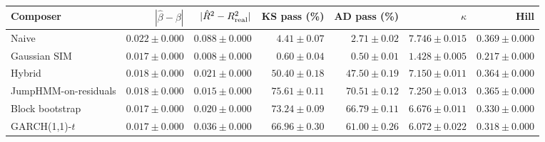 \begin{tabular}{lrrrrrr}
\toprule
Composer & $|\hat\beta-\beta|$ & $|\hat R^2 - R^2_{\mathrm{real}}|$ & KS pass (\%) & AD pass (\%) & $\kappa$ & Hill \\
\midrule
Naive & $0.022 \pm 0.000$ & $0.088 \pm 0.000$ & $4.41 \pm 0.07$ & $2.71 \pm 0.02$ & $7.746 \pm 0.015$ & $0.369 \pm 0.000$ \\
Gaussian SIM & $0.017 \pm 0.000$ & $0.008 \pm 0.000$ & $0.60 \pm 0.04$ & $0.50 \pm 0.01$ & $1.428 \pm 0.005$ & $0.217 \pm 0.000$ \\
Hybrid & $0.018 \pm 0.000$ & $0.021 \pm 0.000$ & $50.40 \pm 0.18$ & $47.50 \pm 0.19$ & $7.150 \pm 0.011$ & $0.364 \pm 0.000$ \\
JumpHMM-on-residuals & $0.018 \pm 0.000$ & $0.015 \pm 0.000$ & $75.61 \pm 0.11$ & $70.51 \pm 0.12$ & $7.250 \pm 0.013$ & $0.365 \pm 0.000$ \\
Block bootstrap & $0.017 \pm 0.000$ & $0.020 \pm 0.000$ & $73.24 \pm 0.09$ & $66.79 \pm 0.11$ & $6.676 \pm 0.011$ & $0.330 \pm 0.000$ \\
GARCH(1,1)-$t$ & $0.017 \pm 0.000$ & $0.036 \pm 0.000$ & $66.96 \pm 0.30$ & $61.00 \pm 0.26$ & $6.072 \pm 0.022$ & $0.318 \pm 0.000$ \\
\bottomrule
\end{tabular}
